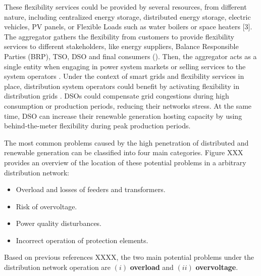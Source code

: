 These flexibility services could be provided by several resources, from different nature, including centralized energy storage, distributed energy storage, electric vehicles, PV panels, or Flexible Loads such as water boilers or space heaters [3]. The aggregator gathers the flexibility from customers to provide flexibility services to different stakeholders, like energy suppliers, Balance Responsible Parties (BRP), TSO, DSO and final consumers (\cite{USEFFoundation2015a, Olivella2018}). Then, the aggregator acts as a single entity when engaging in power system markets or selling services to the system operators \cite{BURGER2017}. Under the context of smart grids and flexibility services in place, distribution system operators could benefit by activating flexibility in distribution grids \cite{USEFFoundation2015a, spiliotis2016demand, esmat2016conf, hashemi2016}. DSOs could compensate grid congestions during high consumption or production periods, reducing their networks stress. At the same time, DSO can increase their renewable generation hosting capacity by using behind-the-meter flexibility during peak production periods. 

The most common problems caused by the high penetration of distributed and renewable generation can be classified into four main categories. Figure XXX provides an overview of the location of these potential problems in a arbitrary distribution network:  

\begin{itemize}
\item Overload and losses of feeders and transformers. 
\item Risk of overvoltage.
\item Power quality disturbances.
\item Incorrect operation of protection elements. 
\end{itemize}

Based on previous references XXXX, the two main potential problems under the distribution network operation are $(i)$ \textbf{overload} and  $(ii)$ \textbf{overvoltage}. 


